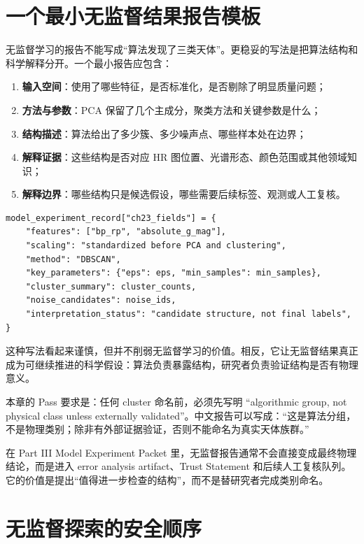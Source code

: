 \section{一个最小无监督结果报告模板}

无监督学习的报告不能写成“算法发现了三类天体”。更稳妥的写法是把算法结构和科学解释分开。一个最小报告应包含：

\begin{enumerate}
    \item \textbf{输入空间}：使用了哪些特征，是否标准化，是否剔除了明显质量问题；
    \item \textbf{方法与参数}：PCA 保留了几个主成分，聚类方法和关键参数是什么；
    \item \textbf{结构描述}：算法给出了多少簇、多少噪声点、哪些样本处在边界；
    \item \textbf{解释证据}：这些结构是否对应 HR 图位置、光谱形态、颜色范围或其他领域知识；
    \item \textbf{解释边界}：哪些结构只是候选假设，哪些需要后续标签、观测或人工复核。
\end{enumerate}

\begin{examplebox}[无监督报告的最小骨架]
\begin{lstlisting}[style=pythonstyle]
model_experiment_record["ch23_fields"] = {
    "features": ["bp_rp", "absolute_g_mag"],
    "scaling": "standardized before PCA and clustering",
    "method": "DBSCAN",
    "key_parameters": {"eps": eps, "min_samples": min_samples},
    "cluster_summary": cluster_counts,
    "noise_candidates": noise_ids,
    "interpretation_status": "candidate structure, not final labels",
}
\end{lstlisting}
\end{examplebox}

这种写法看起来谨慎，但并不削弱无监督学习的价值。相反，它让无监督结果真正成为可继续推进的科学假设：算法负责暴露结构，研究者负责验证结构是否有物理意义。

本章的 Pass 要求是：任何 cluster 命名前，必须先写明 ``algorithmic group, not physical class unless externally validated''。中文报告可以写成：“这是算法分组，不是物理类别；除非有外部证据验证，否则不能命名为真实天体族群。”

在 Part III Model Experiment Packet 里，无监督报告通常不会直接变成最终物理结论，而是进入 error analysis artifact、Trust Statement 和后续人工复核队列。它的价值是提出“值得进一步检查的结构”，而不是替研究者完成类别命名。

\section{无监督探索的安全顺序}

